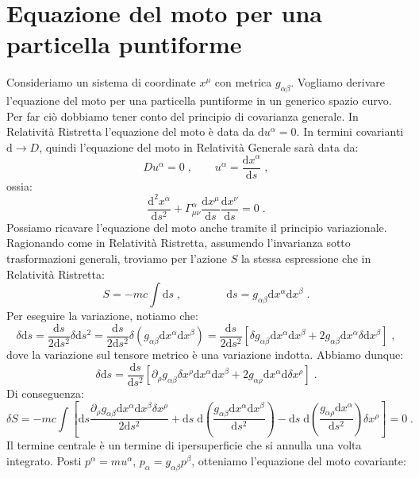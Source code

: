 \documentclass[12pt,a4paper]{report}
\theoremstyle{definition}
\newcommand{\diff}[1][]{\mathrm{d}#1}
\begin{document}
\section{Equazione del moto per una particella puntiforme}
Consideriamo un sistema di coordinate $x^{\mu}$ con metrica $g_{\alpha\beta}$. Vogliamo derivare l'equazione del moto per una particella puntiforme in un generico spazio curvo. Per far ciò dobbiamo tener conto del principio di covarianza generale. In Relatività Ristretta l'equazione del moto è data da $\diff{u^{\alpha}}=0$. In termini covarianti $\diff\to D$, quindi l'equazione del moto in Relatività Generale sarà data da:
\begin{equation}
Du^{\alpha}=0\;,\qquad u^{\alpha}=\frac{\diff{x^{\alpha}}}{\diff{s}}\;,
\end{equation}
ossia:
\begin{equation}
\frac{\diff^2{x^{\alpha}}}{\diff{s^2}}+\Gamma^{\alpha}_{\mu\nu}\frac{\diff{x^{\mu}}}{\diff{s}}\frac{\diff{x^{\nu}}}{\diff{s}}=0\;.
\end{equation}
Possiamo ricavare l'equazione del moto anche tramite il principio variazionale. Ragionando come in Relatività Ristretta, assumendo l'invarianza sotto trasformazioni generali, troviamo per l'azione $S$ la stessa espressione che in Relatività Ristretta:
\begin{equation}
S=-mc\int\diff{s}\;,\qquad\qquad \diff{s}=g_{\alpha\beta}\diff{x^{\alpha}}\diff{x^{\beta}}\;.
\end{equation}
Per eseguire la variazione, notiamo che:
$$
\delta\diff{s}=\frac{\diff{s}}{2\diff{s^2}}\delta\diff{s^2}=\frac{\diff{s}}{2\diff{s^2}}\delta(g_{\alpha\beta}\diff{x^{\alpha}}\diff{x^{\beta}})=\frac{\diff{s}}{2\diff{s^2}}[\delta g_{\alpha\beta}\diff{x^{\alpha}}\diff{x^{\beta}}+2g_{\alpha\beta}\diff{x^{\alpha}}\delta\diff{x^{\beta}}]\;,
$$
dove la variazione sul tensore metrico è una variazione indotta. Abbiamo dunque:
$$
\delta\diff{s}= \frac{\diff{s}}{\diff{s^2}}\left[\partial_{\rho}g_{\alpha\beta}\delta x^{\rho}\diff{x^{\alpha}}\diff{x^{\beta}}+2g_{\alpha\rho}\diff{x^{\alpha}}\diff{\delta x^{\rho}}\right]\;.
$$
Di conseguenza:
$$
\delta S=-mc\int\left[\diff{s}\frac{\partial_{\rho}g_{\alpha\beta}\diff{x^{\alpha}}\diff{x^{\beta}}\delta x^{\rho}}{2\diff{s^2}}+\diff{s}\;\diff{\left(\frac{g_{\alpha\beta}\diff{x^{\alpha}}\diff{x^{\beta}}}{\diff{s^2}}\right)}-
\diff{s}\;\diff{\left(\frac{g_{\alpha\rho}\diff{x^{\alpha}}}{\diff{s^2}}\right)\delta x^{\rho}}\right]=0\;.
$$
Il termine centrale è un termine di ipersuperficie che si annulla una volta integrato. Posti $p^{\alpha}=mu^{\alpha}$, $p_{\alpha}=g_{\alpha\beta}p^{\beta}$, otteniamo l'equazione del moto covariante:
\end{document}
